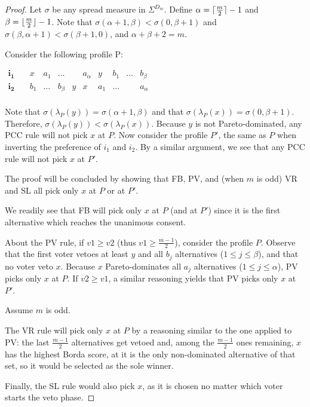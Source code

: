 \documentclass[version=3.21, pagesize, twoside=off, bibliography=totoc, DIV=calc, fontsize=12pt, a4paper]{scrartcl}
\begin{document}
\begin{proof}
    Let $\sigma$ be any spread measure in $\Sigma^{D_m}$. Define $\alpha = \lceil\frac{m}{2}\rceil - 1$ and $\beta = \lfloor\frac{m}{2}\rfloor - 1$. Note that $\sigma(\alpha + 1, \beta) < \sigma(0, \beta + 1)$ and $\sigma(\beta, \alpha + 1) < \sigma(\beta + 1, 0)$, and $\alpha + \beta + 2 = m$.
    
	Consider the following profile P:
		\begin{center}
			$
			\begin{array}{cccccccccc}
				\mathbf{i_1} \quad &x&a_1&\dots&&a_\alpha&y&b_1&\dots&b_\beta\\
				\mathbf{i_2} \quad &b_1&\dots&b_\beta&y&x&a_1&\dots&&a_\alpha\\
			\end{array}
			$
		\end{center}
	Note that $\sigma(\lambda_{P}(y)) = \sigma(\alpha + 1, \beta)$ and that $\sigma(\lambda_{P}(x)) = \sigma(0, \beta + 1)$. 
	Therefore, $\sigma(\lambda_{P}(y)) < \sigma(\lambda_{P}(x))$. Because $y$ is not Pareto-dominated, any PCC rule will not pick $x$ at $P$.
	Now consider the profile $P'$, the same as $P$ when inverting the preference of $i_1$ and $i_2$. 
	By a similar argument, we see that any PCC rule will not pick $x$ at $P'$.
	
	The proof will be concluded by showing that FB, PV, and (when $m$ is odd) VR and SL all pick only $x$ at $P$ or at $P'$.
	
	We readily see that FB will pick only $x$ at $P$ (and at $P'$) since it is the first alternative which reaches the unanimous consent.
	
	About the PV rule, if $v1 ≥ v2$ (thus $v1 ≥ \frac{m-1}{2}$), consider the profile $P$. Observe that the first voter vetoes at least $y$ and all $b_j$ alternatives ($1 ≤ j ≤ \beta$), and that no voter veto $x$. Because $x$ Pareto-dominates all $a_j$ alternatives ($1 ≤ j ≤ \alpha$), PV picks only $x$ at $P$. If $v2 ≥ v1$, a similar reasoning yields that PV picks only $x$ at $P'$. 
	
	Assume $m$ is odd.
	
	The VR rule will pick only $x$ at $P$ by a reasoning similar to the one applied to PV: the last $\frac{m-1}{2}$ alternatives get vetoed and, among the $\frac{m-1}{2}$ ones remaining, $x$ has the highest Borda score, at it is the only non-dominated alternative of that set, so it would be selected as the sole winner.
	
	Finally, the SL rule would also pick $x$, as it is chosen no matter which voter starts the veto phase.
\end{proof}
 
\end{document}
